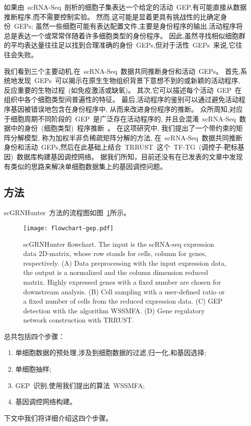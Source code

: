 如果由~scRNA-Seq~剖析的细胞子集表达一个给定的活动~GEP,有可能直接从数据推断程序,而不需要控制实验。
然而,这可能是显着更具有挑战性的比确定身份~GEPs;
虽然一些细胞可能有表达配置文件,主要是身份程序的输出,活动程序将总是表达一个或常常伴随着许多细胞类型的身份程序。
因此,虽然寻找相似细胞群的平均表达量往往足以找到合理准确的身份~GEPs,但对于活性~GEPs~来说,它往往会失败。

我们看到三个主要动机,在~scRNA-Seq~数据共同推断身份和活动~GEPs。
首先,系统地发现~GEPs~可以揭示在原生生物组织背景下意想不到的或新颖的活动程序,
反应重要的生物过程~(如免疫激活或缺氧)。
其次,它可以描述每个活动~GEP~在组织中各个细胞类型间普遍性的特征。
最后,活动程序的鉴别可以通过避免活动程序基因被错误地包含在身份程序中, 从而来改进身份程序的推断。
众所周知,对应于细胞周期不同阶段的~GEP~是广泛存在活动程序的,
并且会混淆~scRNA-Seq~数据中的身份~(细胞类型)~程序推断~\cite{scialdone2015computational,chen2017controlling}。
在这项研究中, 我们提出了一个带约束的矩阵分解模型, 称为加权半非负稀疏矩阵分解的方法,
在~scRNA-Seq~数据共同推断身份和活动~GEPs,然后在此基础上结合~TRRUST~这个~TF-TG~(调控子-靶标基因)~数据库构建基因调控网络。
据我们所知，目前还没有在已发表的文章中发现有类似的思路来解决单细胞数据集上的基因调控问题。

\subsection{方法}
scGRNHunter~方法的流程图如图~\ref{fig:gep-flowchart}所示。
\begin{figure}[!htbp]
    \centering
    \texttt{[image: flowchart-gep.pdf]}
    \caption{
        scGRNHunter flowchart. The input is the scRNA-seq expression data 2D-matrix, whose row stands for cells, column for genes, respectively.
        (A) Data preprocessing with the input expression data, the output is  a normalized and the column dimension reduced matrix. 
        Highly expressed genes with a fixed number are chosen for downstream analysis.
        (B) Cell sampling with a user-defined ratio or a fixed number of cells  from the reduced expression data. 
        (C) GEP detection with the algorithm WSSMFA. 
        (D) Gene regulatory network construction with TRRUST.
    }
    \label{fig:gep-flowchart}
\end{figure}
总共包括四个步骤：
\begin{enumerate}
    \item 单细胞数据的预处理,涉及到细胞数据的过滤,归一化,和基因选择;
    \item 单细胞抽样;
    \item GEP~识别,使用我们提出的算法~WSSMFA;
    \item 基因调控网络构建。
\end{enumerate}
下文中我们将详细介绍这四个步骤。

